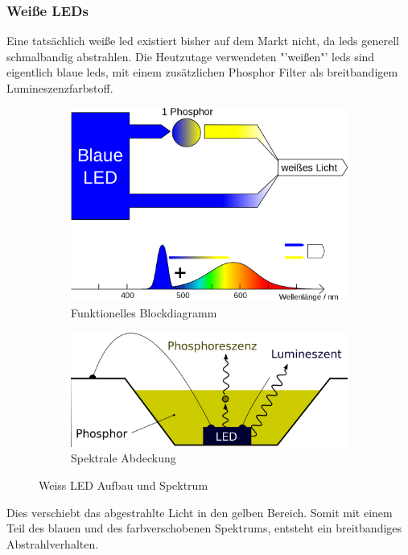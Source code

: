 \documentclass[11pt]{scrartcl}
\begin{document}
\subsubsection{Weiße LEDs}
Eine tatsächlich weiße \ac{led} existiert bisher auf dem Markt nicht, da \ac{led}s generell schmalbandig abstrahlen. Die Heutzutage
verwendeten "'weißen"' \ac{led}s sind eigentlich blaue \ac{led}s, mit einem zusätzlichen Phosphor Filter als breitbandigem Lumineszenzfarbstoff.
\begin{figure}[H]
    \centering
    \begin{subfigure}[b]{0.49\textwidth}
        \includegraphics[width=\textwidth]{images/LED_weiss_P_blau.png}
        \caption{Funktionelles Blockdiagramm}
    \end{subfigure}
    \hfill 
    \begin{subfigure}[b]{0.49\textwidth}
        \includegraphics[width=\textwidth]{images/LED_weiss_phosphor.png}
        \caption{Spektrale Abdeckung}
    \end{subfigure}
    \caption{Weiss LED Aufbau und Spektrum \cite{wikiLed}}\label{fig:White LED}
\end{figure}
\noindent
Dies verschiebt das abgestrahlte Licht in den gelben Bereich. Somit mit einem Teil des blauen und des farbverschobenen Spektrums, entsteht
ein breitbandiges Abstrahlverhalten.
\end{document}
